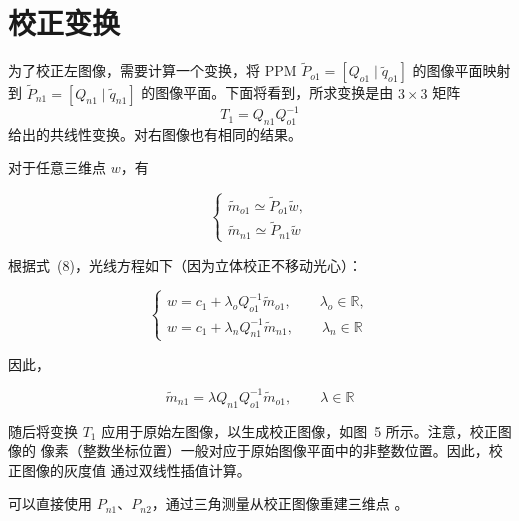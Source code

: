 
\section{校正变换}
\label{sec:rectifying-transformation}

为了校正左图像，需要计算一个变换，将 PPM
$\widetilde{P}_{o1}=[Q_{o1}\mid\tilde{q}_{o1}]$ 的图像平面映射到
$\widetilde{P}_{n1}=[Q_{n1}\mid\tilde{q}_{n1}]$ 的图像平面。下面将看到，所求变换是由
$3\times3$ 矩阵
\[
  T_1=Q_{n1}Q_{o1}^{-1}
\]
给出的共线性变换。对右图像也有相同的结果。

对于任意三维点 $w$，有

\begin{equation}
  \begin{cases}
    \tilde{m}_{o1}\simeq\widetilde{P}_{o1}\tilde{w},\\
    \tilde{m}_{n1}\simeq\widetilde{P}_{n1}\tilde{w}
  \end{cases}
  \label{eq:original-new-projection}
\end{equation}

根据式~(8)，光线方程如下（因为立体校正不移动光心）：

\begin{equation}
  \begin{cases}
    w=c_1+\lambda_o Q_{o1}^{-1}\tilde{m}_{o1},\qquad \lambda_o\in\mathbb{R},\\
    w=c_1+\lambda_n Q_{n1}^{-1}\tilde{m}_{n1},\qquad \lambda_n\in\mathbb{R}
  \end{cases}
  \label{eq:original-new-rays}
\end{equation}

因此，

\begin{equation}
  \tilde{m}_{n1}=\lambda Q_{n1}Q_{o1}^{-1}\tilde{m}_{o1},\qquad \lambda\in\mathbb{R}
  \label{eq:rectifying-collinearity}
\end{equation}

随后将变换 $T_1$ 应用于原始左图像，以生成校正图像，如图~5 所示。注意，校正图像的
像素（整数坐标位置）一般对应于原始图像平面中的非整数位置。因此，校正图像的灰度值
通过双线性插值计算。

可以直接使用 $P_{n1}$、$P_{n2}$，通过三角测量从校正图像重建三维点
\citep{hartleySturm1997}。
